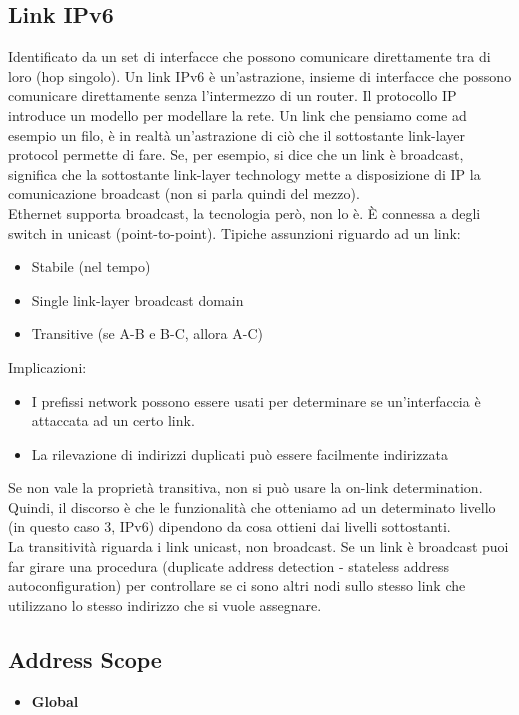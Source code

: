 \documentclass{article}
\begin{document}
\subsection{Link IPv6}
Identificato da un set di interfacce che possono comunicare direttamente tra di loro (hop singolo). Un link IPv6 è un’astrazione, insieme di interfacce che possono comunicare direttamente senza l’intermezzo di un router. 
Il protocollo IP introduce un modello per modellare la rete. Un link che pensiamo come ad esempio un filo, è in realtà un'astrazione di ciò che il sottostante link-layer protocol permette di fare. Se, per esempio, si dice che un link è broadcast, significa che la sottostante link-layer technology mette a disposizione di IP la comunicazione broadcast (non si parla quindi del mezzo). \\
Ethernet supporta broadcast, la tecnologia però, non lo è. È connessa a degli switch in unicast (point-to-point).
Tipiche assunzioni riguardo ad un link:
\begin{itemize}
    \item Stabile (nel tempo)
    \item Single link-layer broadcast domain
    \item Transitive (se A-B e B-C, allora A-C)
\end{itemize}{}
Implicazioni:
\begin{itemize}
    \item I prefissi network possono essere usati per determinare se un'interfaccia è attaccata ad un certo link.
    \item La rilevazione di indirizzi duplicati può essere facilmente indirizzata
\end{itemize}{}
Se non vale la proprietà transitiva, non si può usare la on-link determination. Quindi, il discorso è che le funzionalità che otteniamo ad un determinato livello (in questo caso 3, IPv6) dipendono da cosa ottieni dai livelli sottostanti.\\
La transitività riguarda i link unicast, non broadcast. Se un link è broadcast puoi far girare una procedura (duplicate address detection - stateless address autoconfiguration) per controllare se ci sono altri nodi sullo stesso link che utilizzano lo stesso indirizzo che si vuole assegnare.

\subsection{Address Scope}
\begin{itemize}
    \item \textbf{Global}
\end{itemize}{}
\end{document}
